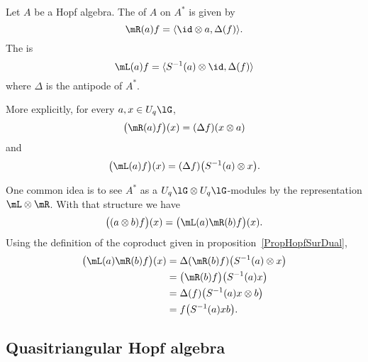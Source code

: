 \begin{definition}  \label{DefUMXgVdT}
	Let \( A\) be a Hopf algebra. The  of \( A\) on \( A^*\) is given by
	\begin{equation}
		\mR(a)f=\langle \id\otimes a, \Delta(f)\rangle .
	\end{equation}
	The  is
	\begin{equation}
		\mL(a)f=\langle S^{-1}(a)\otimes \id, \Delta(f)\rangle
	\end{equation}
	where \( \Delta\) is the antipode of \( A^*\).
\end{definition}
More explicitly, for every \( a,x\in U_q\lG\),
\begin{equation}
	\big( \mR(a)f \big)(x)=(\Delta f)(x\otimes a)
\end{equation}
and
\begin{equation}
	\big( \mL(a)f \big)(x)=(\Delta f)\big( S^{-1}(a)\otimes x \big).
\end{equation}

One common idea is to see \( A^*\) as a \( U_q\lG\otimes U_q\lG\)-modules by the representation \( \mL\otimes\mR\). With that structure we have
\begin{equation}        \label{EqmRmLAAsurAstar}
	\big( (a\otimes b)f \big)(x)=\big( \mL(a)\mR(b)f \big)(x).
\end{equation}
Using the definition of the coproduct given in proposition~\ref{PropHopfSurDual},
\begin{equation}        \label{EqmRmLabf}
	\begin{aligned}[]
		\big( \mL(a)\mR(b)f \big)(x) & =\Delta(\mR(b)f)\big( S^{-1}(a)\otimes x \big) \\
		                             & =\big( \mR(b)f \big)\big( S^{-1}(a)x \big)     \\
		                             & =\Delta(f)\big( S^{-1}(a)x\otimes b \big)      \\
		                             & =f\big( S^{-1}(a)xb \big).
	\end{aligned}
\end{equation}

\subsection{Quasitriangular Hopf algebra}

